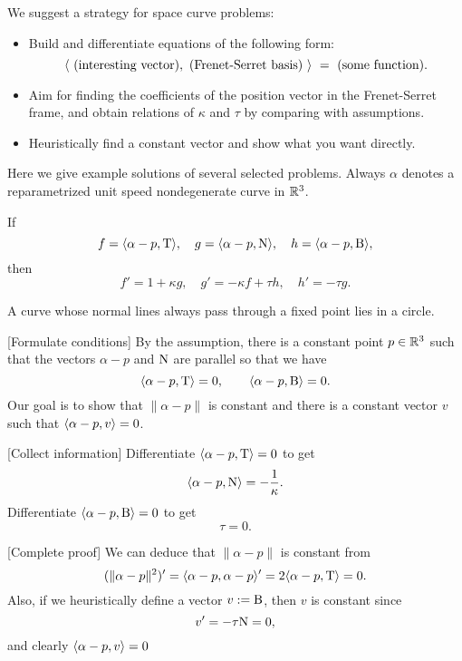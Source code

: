 \documentclass{../note}
\def\a{\alpha}
\begin{document}
We suggest a strategy for space curve problems:
\begin{itemize}
\item Build and differentiate equations of the following form:
\[\<\ \text{(interesting vector)},\ \text{(Frenet-Serret basis)}\ \>\ =\ \text{(some function)}.\]
\item Aim for finding the coefficients of the position vector in the Frenet-Serret frame, and obtain relations of $\kappa$ and $\tau$ by comparing with assumptions.
\item Heuristically find a constant vector and show what you want directly.
\end{itemize}
Here we give example solutions of several selected problems.
Always $\a$ denotes a reparametrized unit speed nondegenerate curve in $\mathbb{R}^3$.


If
\[f=\<\a-p,\rT\>,\quad g=\<\a-p,\rN\>,\quad h=\<\a-p,\rB\>,\]
then
\[f'=1+\kappa g,\quad g'=-\kappa f+\tau h,\quad h'=-\tau g.\]

\begin{prb}
A curve whose normal lines always pass through a fixed point lies in a circle.
\end{prb}
\begin{sol}
[Formulate conditions]
By the assumption, there is a constant point $p\in\mathbb{R}^3$ such that the vectors $\a-p$ and $\mathrm{N}$ are parallel so that we have
\[\<\a-p,\rT\>=0,\qquad\<\a-p,\rB\>=0.\]
Our goal is to show that $\|\a-p\|$ is constant and there is a constant vector $v$ such that $\<\a-p,v\>=0$.

[Collect information]
Differentiate $\<\a-p,\rT\>=0$ to get
\[\<\a-p,\rN\>=-\frac1\kappa.\]
Differentiate $\<\a-p,\rB\>=0$ to get
\[\tau=0.\]

[Complete proof]
We can deduce that $\|\a-p\|$ is constant from
\[(\|\a-p\|^2)'=\<\a-p,\a-p\>'=2\<\a-p,\rT\>=0.\]
Also, if we heuristically define a vector $v:=\mathrm{B}$, then $v$ is constant since
\[v'=-\tau\mathrm{N}=0,\]
and clearly $\<\a-p,v\>=0$
\end{sol}
\end{document}

